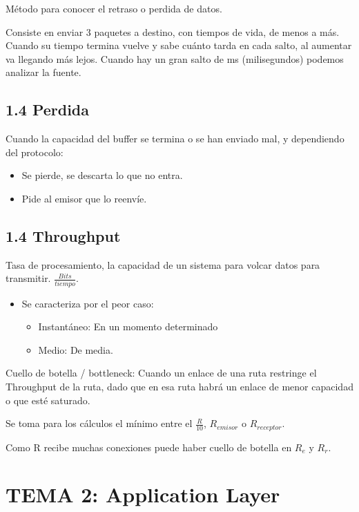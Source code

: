 \documentclass[12pt, twoside, openright]{report} %
\begin{document}
Método para conocer el retraso o perdida de datos.

Consiste en enviar 3 paquetes a destino, con tiempos de vida, de menos
a más. Cuando su tiempo termina vuelve y sabe cuánto tarda en cada
salto, al aumentar va llegando más lejos. Cuando hay un gran salto de
ms (milisegundos) podemos analizar la fuente.

\section{1.4 Perdida}

Cuando la capacidad del buffer se termina o se han enviado mal, y
dependiendo del protocolo:

\begin{itemize}
	\item Se pierde, se descarta lo que no entra.
	\item Pide al emisor que lo reenvíe.
\end{itemize}

\section{1.4 Throughput}


Tasa de procesamiento, la capacidad de un sistema para volcar datos
para transmitir. \(\frac{Bits}{tiempo}\).

\begin{itemize}
	\item Se caracteriza por el peor caso:

	      \begin{itemize}
		      \item Instantáneo: En un momento determinado
		      \item Medio: De media.
	      \end{itemize}
\end{itemize}

Cuello de botella / bottleneck: Cuando un enlace de una ruta restringe
el Throughput de la ruta, dado que en esa ruta habrá un enlace de
menor capacidad o que esté saturado.

Se toma para los cálculos el mínimo entre el \(\frac{R}{10}\),
\(R_{emisor}\) o \(R_{receptor}\).

Como R recibe muchas conexiones puede haber cuello de botella en
\(R_e\) y \(R_r\).

\chapter{TEMA 2: Application Layer}
\end{document}
